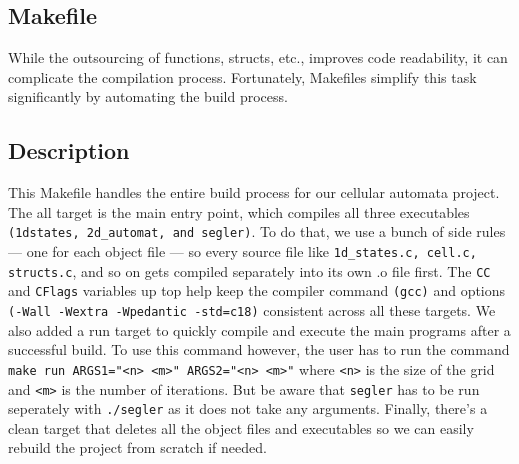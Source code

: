 \documentclass[12pt,a4paper]{article}
\begin{document}
\vspace{1cm}

\subsection{Makefile}
While the outsourcing of functions, structs, etc., improves code readability, it can complicate the compilation process. 
Fortunately, Makefiles simplify this task significantly by automating the build process.
\newline
\subsection*{\small Description}
This Makefile handles the entire build process for our cellular automata project. The all target is the main entry 
point, which compiles all three executables \texttt{(1dstates, 2d\_automat, and segler)}. To do that, we use a bunch of side rules 
— one for each object file — so every source file like \texttt{1d\_states.c, cell.c, structs.c}, and so on gets compiled separately 
into its own .o file first. The \texttt{CC} and \texttt{CFlags} variables up top help keep the compiler command \texttt{(gcc)} and options 
\texttt{(-Wall -Wextra -Wpedantic -std=c18)} consistent across all these targets.
\vspace{0.1cm}
We also added a run target to quickly compile and execute the main programs after a successful build. To use this command however, 
the user has to run the command \texttt{make run ARGS1="<n> <m>" ARGS2="<n> <m>"} where \texttt{<n>} is the size of the grid and 
\texttt{<m>} is the number of iterations. But be aware that \texttt{segler} has to be run seperately with \texttt{./segler} as it does not take any arguments.
Finally, there’s a clean target that deletes all the object files and executables so we can easily rebuild the project from scratch if needed.

\vspace{0.5cm}
\end{document}
